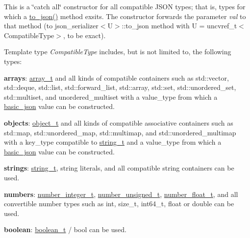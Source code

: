 This is a \char`\"{}catch all\char`\"{} constructor for all compatible J\+S\+ON types; that is, types for which a {\ttfamily \hyperlink{namespacenlohmann_1_1detail_aa7a47b08eee864c2c108c04954919648}{to\+\_\+json()}} method exsits. The constructor forwards the parameter {\itshape val} to that method (to {\ttfamily json\+\_\+serializer$<$U$>$\+::to\+\_\+json} method with {\ttfamily U = uncvref\+\_\+t$<$Compatible\+Type$>$}, to be exact).

Template type {\itshape Compatible\+Type} includes, but is not limited to, the following types\+:
\begin{DoxyItemize}
\item {\bfseries arrays}\+: \hyperlink{classnlohmann_1_1basic__json_a4c409f1b6d9caf3412c78af9a5883fed}{array\+\_\+t} and all kinds of compatible containers such as {\ttfamily std\+::vector}, {\ttfamily std\+::deque}, {\ttfamily std\+::list}, {\ttfamily std\+::forward\+\_\+list}, {\ttfamily std\+::array}, {\ttfamily std\+::set}, {\ttfamily std\+::unordered\+\_\+set}, {\ttfamily std\+::multiset}, and {\ttfamily unordered\+\_\+multiset} with a {\ttfamily value\+\_\+type} from which a \hyperlink{classnlohmann_1_1basic__json}{basic\+\_\+json} value can be constructed.
\item {\bfseries objects}\+: \hyperlink{classnlohmann_1_1basic__json_a3cdea044cc3ecba1c4f9874a89daf6e4}{object\+\_\+t} and all kinds of compatible associative containers such as {\ttfamily std\+::map}, {\ttfamily std\+::unordered\+\_\+map}, {\ttfamily std\+::multimap}, and {\ttfamily std\+::unordered\+\_\+multimap} with a {\ttfamily key\+\_\+type} compatible to \hyperlink{classnlohmann_1_1basic__json_a61f8566a1a85a424c7266fb531dca005}{string\+\_\+t} and a {\ttfamily value\+\_\+type} from which a \hyperlink{classnlohmann_1_1basic__json}{basic\+\_\+json} value can be constructed.
\item {\bfseries strings}\+: \hyperlink{classnlohmann_1_1basic__json_a61f8566a1a85a424c7266fb531dca005}{string\+\_\+t}, string literals, and all compatible string containers can be used.
\item {\bfseries numbers}\+: \hyperlink{classnlohmann_1_1basic__json_a98e611d67b7bd75307de99c9358ab2dc}{number\+\_\+integer\+\_\+t}, \hyperlink{classnlohmann_1_1basic__json_ab906e29b5d83ac162e823ada2156b989}{number\+\_\+unsigned\+\_\+t}, \hyperlink{classnlohmann_1_1basic__json_a88d6103cb3620410b35200ee8e313d97}{number\+\_\+float\+\_\+t}, and all convertible number types such as {\ttfamily int}, {\ttfamily size\+\_\+t}, {\ttfamily int64\+\_\+t}, {\ttfamily float} or {\ttfamily double} can be used.
\item {\bfseries boolean}\+: \hyperlink{classnlohmann_1_1basic__json_a4c919102a9b4fe0d588af64801436082}{boolean\+\_\+t} / {\ttfamily bool} can be used.
\end{DoxyItemize}

